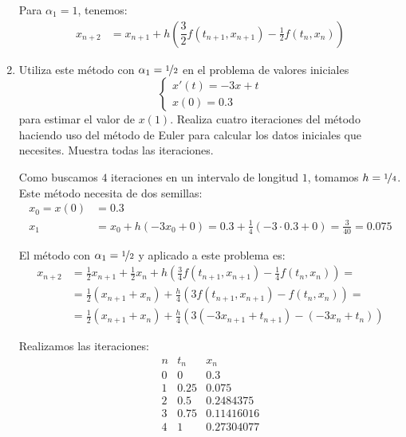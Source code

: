 \begin{ejercicio}
\begin{enumerate}
        Para $\alpha_1 = 1$, tenemos:
        \begin{align*}
            x_{n+2} &= x_{n+1} + h \left(\dfrac{3}{2} f(t_{n+1}, x_{n+1}) - \frac{1}{2} f(t_n, x_n)\right)
        \end{align*}
        \item Utiliza este método con $\alpha_1 = \nicefrac{1}{2}$ en el problema de valores iniciales
            \begin{equation*}
                \begin{cases}
                    x'(t) = -3x + t \\
                    x(0) = 0.3
                \end{cases}
            \end{equation*}
            para estimar el valor de $x(1)$. Realiza cuatro iteraciones del método haciendo uso del método de Euler para calcular los datos iniciales que necesites. Muestra todas las iteraciones.



            Como buscamos $4$ iteraciones en un intervalo de longitud $1$, tomamos $h = \nicefrac{1}{4}$. Este método necesita de dos semillas:
            \begin{align*}
                x_0 = x(0) &= 0.3 \\
                x_1 &= x_0 + h(-3x_0+0) = 0.3 + \frac{1}{4}(-3\cdot 0.3 + 0) = \frac{3}{40} = 0.075
            \end{align*}

            El método con $\alpha_1 = \nicefrac{1}{2}$ y aplicado a este problema es:
            \begin{align*}
                x_{n+2} &= \frac{1}{2} x_{n+1} + \frac{1}{2} x_n + h \left( \frac{3}{4} f(t_{n+1}, x_{n+1}) - \frac{1}{4} f(t_n, x_n) \right)
                =\\&= \frac{1}{2}\left(x_{n+1} + x_n\right) + \frac{h}{4} \left(3f(t_{n+1}, x_{n+1}) - f(t_n, x_n)\right)
                =\\&= \frac{1}{2}\left(x_{n+1} + x_n\right) + \frac{h}{4} \left(3(-3x_{n+1}+t_{n+1}) - (-3x_n+t_n)\right)
            \end{align*}

            Realizamos las iteraciones:
            \begin{equation*}
                \begin{array}{c|c|c}
                    n & t_n & x_n \\
                    \hline
                    0 & 0 & 0.3 \\
                    1 & 0.25 & 0.075 \\
                    2 & 0.5 & 0.2484375 \\
                    3 & 0.75 & 0.11416016 \\
                    4 & 1 & 0.27304077
                \end{array}
            \end{equation*}
    \end{enumerate}
\end{ejercicio}~\\

